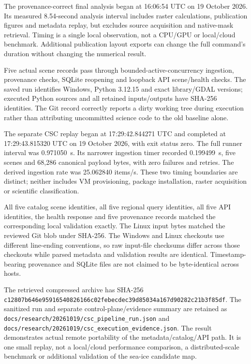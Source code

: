 The provenance-correct final analysis began at 16:06:54 UTC on 19 October 2026. Its measured
8.54-second analysis interval includes raster calculations, publication figures and
metadata replay, but excludes source acquisition and native-mask retrieval. Timing is a
single local observation, not a CPU/GPU or local/cloud benchmark. Additional publication
layout exports can change the full command's duration without changing the numerical result.

Five actual scene records pass through bounded-active-concurrency ingestion, provenance checks, SQLite
reopening and loopback API scene/health checks. The saved run identifies Windows,
Python 3.12.15 and exact library/GDAL versions; executed Python sources and all retained
inputs/outputs have SHA-256 identities. The Git record correctly reports a dirty working
tree during execution rather than attributing uncommitted science code to the old baseline
alone.

The separate CSC replay began at 17:29:42.844271 UTC and completed at 17:29:43.815320 UTC
on 19 October 2026, with exit status zero. The full runner interval was 0.971050~s.
Its narrower ingestion timer recorded 0.199499~s, five scenes and 68,286 canonical payload
bytes, with zero failures and retries. The derived ingestion rate was 25.062840 items/s.
These two timing boundaries are distinct; neither includes VM provisioning, package
installation, raster acquisition or scientific classification.

All five catalog scene identities, all five regional query identities, all five API
identities, the health response and five provenance records matched the corresponding
local validation exactly. The Linux input bytes matched the reviewed Git blob under
SHA-256. The Windows and Linux checkouts use different line-ending conventions, so raw input-file
checksums differ across those checkouts while parsed metadata and validation results
are identical. Timestamp-bearing provenance and SQLite files are not claimed to be
byte-identical across hosts.

The retrieved compressed archive has SHA-256
\nolinkurl{c12807b646e95916540826166c02febecdec39d85034a167d90282c21b3f85df}.
The sanitized run and separate control-plane/evidence summary are retained as
\nolinkurl{docs/research/20261019/csc_pipeline_run.json} and
\nolinkurl{docs/research/20261019/csc_execution_evidence.json}.
The result demonstrates actual remote portability of the metadata/catalog/API path.
It is one small replay, not a local/cloud performance comparison, a distributed-scale
benchmark or additional validation of the sea-ice candidate map.

